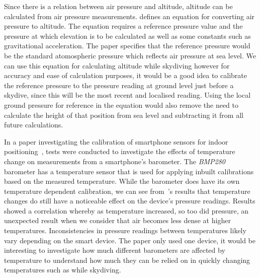 \documentclass[twocolumn]{article}
\begin{document}
Since there is a relation between air pressure and altitude, altitude can be calculated from air pressure measurements. \textcite{liu_beyond_2014} defines an equation for converting air pressure to altitude. The equation requires a reference pressure value and the pressure at which elevation is to be calculated as well as some constants such as gravitational acceleration. The paper specifies that the reference pressure would be the standard atomospheric pressure which reflects air pressure at sea level. We can use this equation for calculating altitude while skydiving however for accuracy and ease of calculation purposes, it would be a good idea to calibrate the reference pressure to the pressure reading at ground level just before a skydive, since this will be the most recent and localised reading. Using the local ground pressure for reference in the equation would also remove the need to calculate the height of that position from sea level and subtracting it from all future calculations.

In a paper investigating the calibration of smartphone sensors for indoor positioning~\cite{keller_calibration_2012}, tests were conducted to investigate the effects of temperature change on measurements from a smartphone's barometer. The \textit{BMP280} barometer has a temperature sensor that is used for applying inbuilt calibrations based on the measured temperature. While the barometer does have its own temperature dependent calibration, we can see from~\citeauthor{keller_calibration_2012}'s results that temperature changes do still have a noticeable effect on the device's pressure readings. Results showed a correlation whereby as temperature increased, so too did pressure, an unexpected result when we consider that air becomes less dense at higher temperatures. Inconsistencies in pressure readings between temperatures likely vary depending on the smart device. The paper only used one device, it would be interesting to investigate how much different barometers are affected by temperature to understand how much they can be relied on in quickly changing temperatures such as while skydiving.
\end{document}
